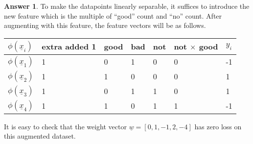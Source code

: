 \documentclass{article}
\theoremstyle{definition}
\newtheorem*{answer}{Answer}
\begin{document}
\begin{question}
\begin{question}
\begin{answer}
			To make the datapoints linearly separable, it suffices to introduce the new feature which is the multiple of ``good'' count and ``no'' count. After augmenting with this feature, the feature vectors will be as follows.
			
			\begin{tabular}{|l|l|l|l|l|l|l|}
					\hline
					$\phi(\underline{x}_i)$& extra added 1 & good & bad & not & not $\times$ good & $y_i$ \\\hline
					$\phi(\underline{x}_1)$& 1& 0 & 1 & 0 & 0 & -1 \\\hline
					$\phi(\underline{x}_2)$& 1& 1	& 0 & 0 & 0 & 1 \\\hline
					$\phi(\underline{x}_3)$& 1& 0	& 1	& 1 & 0 & 1 \\\hline
					$\phi(\underline{x}_4)$& 1& 1	& 0	& 1 & 1 & -1 \\\hline
				\end{tabular}
			
			It is easy to check that the weight vector $\underline{w} = [0, 1, -1, 2, -4]$ has zero loss on this augmented dataset.
		\end{answer}
	\end{question}
	

\end{question}
\end{document}
